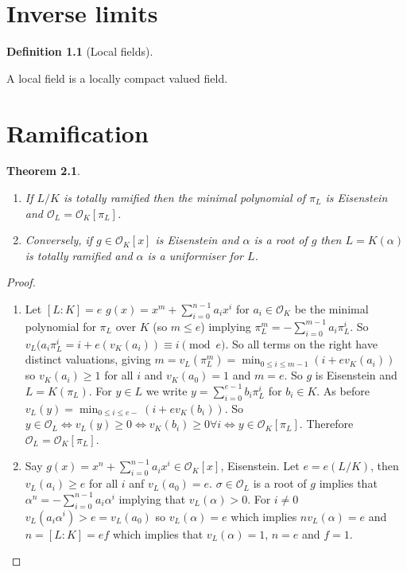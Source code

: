 \documentclass[10pt,]{book}
\newcommand{\gt}{>}
\theoremstyle{plain}
\newtheorem{theorem}{Theorem}[section]
\theoremstyle{definition}
\newtheorem{definition}[theorem]{Definition}
\newcommand{\cO}{\mathcal{O}}
\begin{document}
\chapter[Inverse limits]{Inverse limits}\label{chap-inverse}
\begin{definition}[Local fields]\label{definition-11}

          A local field is a locally compact valued field.
        \end{definition}
\typeout{************************************************}
\typeout{************************************************}
\chapter[Ramification]{Ramification}\label{chap-ramification}
\begin{theorem}\label{theorem-9}
\begin{enumerate}
\item{}If \(L/K\) is totally ramified then the minimal polynomial of \(\pi_L\) is Eisenstein and \(\cO_L = \cO_K[\pi_L]\).\item{}Conversely, if \(g\in \cO_K[x]\) is Eisenstein and \(\alpha\) is a root of \(g\) then \(L = K(\alpha)\) is totally ramified and \(\alpha\) is a uniformiser for \(L\).\end{enumerate}
\end{theorem}
\begin{proof}
\begin{enumerate}
\item{}
              Let \([L:K] = e\) \(g(x) = x^m + \sum_{i=0}^{n-1}a_i x^i\) for \(a_i\in\cO_K\) be the minimal polynomial for \(\pi_L\) over \(K\) (so \(m\le e\)) implying \(\pi_L^m = - \sum_{i=0}^{m-1} a_i \pi_L^i\).
              So \(v_L(a_i \pi_L^i  =i + e(v_K(a_i)) \equiv i \pmod{e}\).
              So all terms on the right have distinct valuations, giving \(m = v_L(\pi_L^m) = \min_{0\le i\le m-1}(i+ev_K(a_i))\) so \(v_K(a_i)\ge 1\) for all \(i\) and \(v_K(a_0) = 1\) and \(m =e\).
              So \(g\) is Eisenstein and \(L = K(\pi_L)\).
              For \(y\in L\) we write \(y  = \sum_{i=0}^{e-1}b_i \pi_L^i\) for \(b_i \in K\).
              As before \(v_L(y) = \min_{0\le i\le e-} (i + ev_K(b_i))\).
              So \(y \in \cO_L \iff v_L(y)\ge 0 \iff v_K(b_i) \ge 0 \forall i\iff y \in \cO_K[\pi_L]\).
              Therefore \(\cO_L = \cO_K[\pi_L]\).
            \item{}
              Say \(g (x) = x^n + \sum_{i=0}^{n-1}a_i x^i \in \cO_K[x]\), Eisenstein.
              Let \(e = e(L/K)\), then \(v_L(a_i) \ge e\) for all \(i\) anf \(v_L(a_0) = e\).
              \(\sigma \in \cO_L\) is a root of \(g\) implies that \(\alpha^n = -\sum_{i=0}^{n-1}a_i\alpha^i\) implying that \(v_L(\alpha) \gt 0\).
              For \(i \ne 0\) \(v_L(a_i\alpha^i) \gt e = v_L(a_0)\) so \(v_L(\alpha) =e \) which implies \(n v_L(\alpha) = e\) and \(n = [L:K] = ef\) which implies that \(v_L(\alpha) = 1\), \(n = e\) and \(f = 1\).
            \end{enumerate}
\end{proof}
\end{document}
